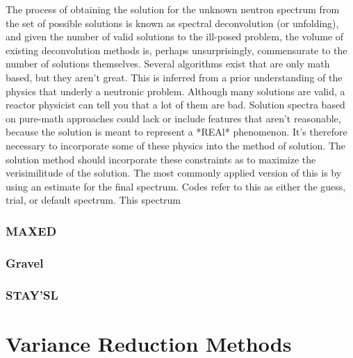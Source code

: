 The process of obtaining the solution for the unknown neutron spectrum from the set of possible solutions is known as spectral deconvolution (or unfolding), and given the number of valid solutions to the ill-posed problem, the volume of existing deconvolution methods is, perhaps unsurprisingly, commensurate to the number of solutions themselves.
Several algorithms exist that are only math based, but they aren't great.
This is inferred from a prior understanding of the physics that underly a neutronic problem.
Although many solutions are valid, a reactor physicist can tell you that a lot of them are bad.
Solution spectra based on pure-math approaches could lack or include features that aren't reasonable, because the solution is meant to represent a *REAl* phenomenon.
It's therefore necessary to incorporate some of these physics into the method of solution.
The solution method should incorporate these constraints as to maximize the verisimilitude of the solution.
The most commonly applied version of this is by using an estimate for the final spectrum.
Codes refer to this as either the guess, trial, or default spectrum.
This spectrum 




\subsubsection{MAXED}





\subsubsection{Gravel}


\subsubsection{STAY'SL}




\section{Variance Reduction Methods}

